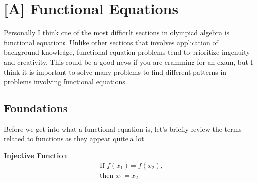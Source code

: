 \documentclass[../../../main.tex]{subfiles}
\begin{document}
\chapter{[A] Functional Equations}

Personally I think one of the most difficult sections in olympiad
algebra is functional equations. Unlike other sections that involves
application of background knowledge, functional equation problems
tend to prioritize ingenuity and creativity. This could be a
good news if you are cramming for an exam, but I think it is
important to solve many problems to find different patterns in
problems involving functional equations.

\section{Foundations}

Before we get into what a functional equation is, let's briefly
review the terms related to functions as they appear quite a lot.

\begin{minipage}{0.48\textwidth}
\begin{center}
\textbf{Injective Function}
\begin{align*}
    &\text{If } f(x_1) = f(x_2), \\
    &\text{then } x_1 = x_2
\end{align*}
\end{center}
\end{minipage}
\hfill
\begin{minipage}{0.48\textwidth}
\begin{center}
\end{center}
\end{minipage}
\end{document}
